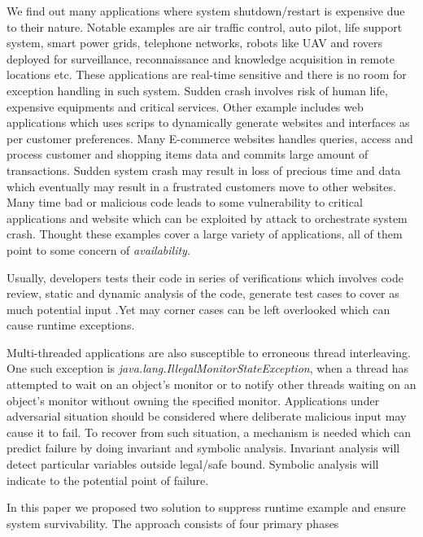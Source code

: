 We find out many applications where system shutdown/restart is expensive due to
their nature.
Notable examples are air traffic control, auto pilot, life support system, smart
power grids, telephone networks, robots like UAV and rovers deployed for
surveillance, reconnaissance and knowledge acquisition in remote locations etc.
These applications are real-time sensitive and there is no room for exception
handling in such system.
Sudden crash involves risk of human life, expensive equipments and critical
services.
Other example includes web applications which uses scrips to dynamically
generate websites and interfaces as per customer preferences.
Many E-commerce websites handles queries, access and process customer and
shopping items data and commits large amount of transactions.
Sudden system crash may result in loss of precious time and data which
eventually may result in a frustrated customers move to other websites.
Many time bad or malicious code leads to some vulnerability to critical
applications and website which can be exploited by attack to orchestrate system
crash. Thought these examples cover a large variety of applications, all of them
point to some concern of \emph{availability}.

Usually, developers tests their code in series of verifications which involves
code review, static and dynamic analysis of the code, generate test cases to
cover as much potential input .Yet may corner cases can be left overlooked which
can cause runtime exceptions.

Multi-threaded applications are also susceptible to erroneous thread
interleaving. One such exception is
\emph{java.lang.IllegalMonitorStateException}, when a thread has attempted to
wait on an object's monitor or to notify other threads waiting on an object's
monitor without owning the specified monitor. Applications under adversarial
situation should be considered where deliberate malicious input may cause it to
fail. To recover from such situation, a mechanism is needed which can predict
failure by doing invariant and symbolic analysis. Invariant analysis will detect
particular variables outside legal/safe bound. Symbolic analysis will indicate
to the potential point of failure.


In this paper we proposed two solution to suppress runtime example and ensure
system survivability. The approach consists of four primary phases

